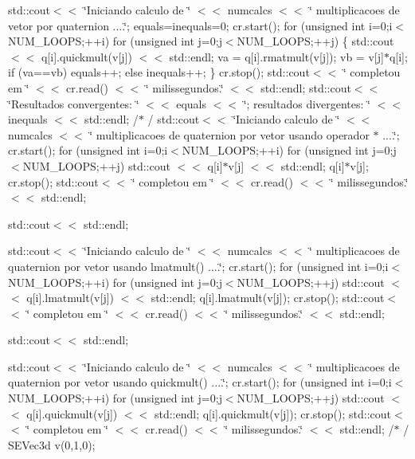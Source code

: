 std\+::cout$<$$<$ \char`\"{}\+Iniciando calculo de \char`\"{} $<$$<$ numcalcs $<$$<$ \char`\"{} multiplicacoes de vetor por quaternion ....\char`\"{}; equals=inequals=0; cr.\+start(); for (unsigned int i=0;i$<$N\+U\+M\+\_\+\+L\+O\+O\+P\+S;++i) for (unsigned int j=0;j$<$N\+U\+M\+\_\+\+L\+O\+O\+P\+S;++j) \{ std\+::cout $<$$<$ q[i].quickmult(v[j]) $<$$<$ std\+::endl; va = q[i].rmatmult(v[j]); vb = v[j]$\ast$q[i]; if (va==vb) equals++; else inequals++; \} cr.\+stop(); std\+::cout$<$$<$ \char`\"{} completou em \char`\"{} $<$$<$ cr.\+read() $<$$<$ \char`\"{} milissegundos.\char`\"{} $<$$<$ std\+::endl; std\+::cout$<$$<$ \char`\"{}\+Resultados convergentes\+: \char`\"{} $<$$<$ equals $<$$<$ \char`\"{}; resultados divergentes\+: \char`\"{} $<$$<$ inequals $<$$<$ std\+::endl; /$\ast$ / std\+::cout$<$$<$ \char`\"{}\+Iniciando calculo de \char`\"{} $<$$<$ numcalcs $<$$<$ \char`\"{} multiplicacoes de quaternion por vetor usando operador $\ast$ ....\char`\"{}; cr.\+start(); for (unsigned int i=0;i$<$N\+U\+M\+\_\+\+L\+O\+O\+P\+S;++i) for (unsigned int j=0;j$<$N\+U\+M\+\_\+\+L\+O\+O\+P\+S;++j) std\+::cout $<$$<$ q[i]$\ast$v[j] $<$$<$ std\+::endl; q[i]$\ast$v[j]; cr.\+stop(); std\+::cout$<$$<$ \char`\"{} completou em \char`\"{} $<$$<$ cr.\+read() $<$$<$ \char`\"{} milissegundos.\char`\"{} $<$$<$ std\+::endl;

std\+::cout$<$$<$ std\+::endl;

std\+::cout$<$$<$ \char`\"{}\+Iniciando calculo de \char`\"{} $<$$<$ numcalcs $<$$<$ \char`\"{} multiplicacoes de quaternion por vetor usando lmatmult() ....\char`\"{}; cr.\+start(); for (unsigned int i=0;i$<$N\+U\+M\+\_\+\+L\+O\+O\+P\+S;++i) for (unsigned int j=0;j$<$N\+U\+M\+\_\+\+L\+O\+O\+P\+S;++j) std\+::cout $<$$<$ q[i].lmatmult(v[j]) $<$$<$ std\+::endl; q[i].lmatmult(v[j]); cr.\+stop(); std\+::cout$<$$<$ \char`\"{} completou em \char`\"{} $<$$<$ cr.\+read() $<$$<$ \char`\"{} milissegundos.\char`\"{} $<$$<$ std\+::endl;

std\+::cout$<$$<$ std\+::endl;

std\+::cout$<$$<$ \char`\"{}\+Iniciando calculo de \char`\"{} $<$$<$ numcalcs $<$$<$ \char`\"{} multiplicacoes de quaternion por vetor usando quickmult() ....\char`\"{}; cr.\+start(); for (unsigned int i=0;i$<$N\+U\+M\+\_\+\+L\+O\+O\+P\+S;++i) for (unsigned int j=0;j$<$N\+U\+M\+\_\+\+L\+O\+O\+P\+S;++j) std\+::cout $<$$<$ q[i].quickmult(v[j]) $<$$<$ std\+::endl; q[i].quickmult(v[j]); cr.\+stop(); std\+::cout$<$$<$ \char`\"{} completou em \char`\"{} $<$$<$ cr.\+read() $<$$<$ \char`\"{} milissegundos.\char`\"{} $<$$<$ std\+::endl; /$\ast$ / S\+E\+Vec3d v(0,1,0);

